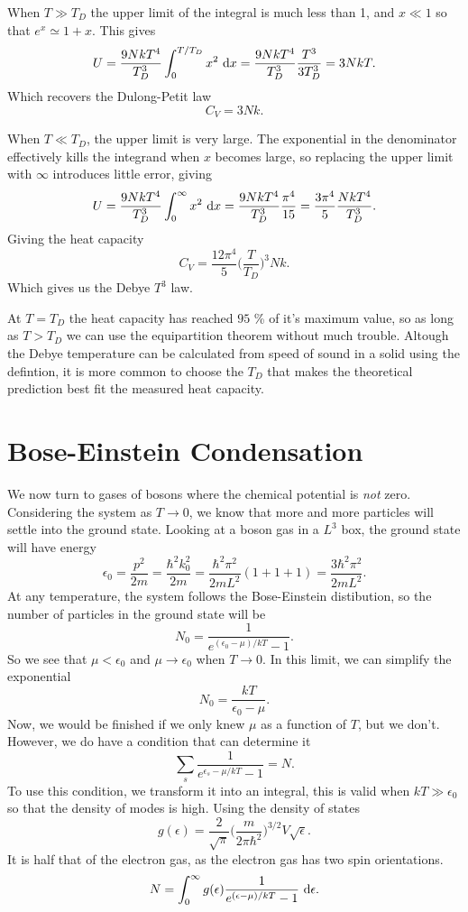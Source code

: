 \documentclass[a4paper, 11pt, notitlepage, english]{article}
\renewcommand{\d}{{\rm d}}
\newcommand{\eps}{\epsilon}
\begin{document}
When $T\gg T_D$ the upper limit of the integral is much less than 1, and $x \ll 1$ so that $e^x \simeq 1 + x$. This gives
$$U = \frac{9NkT^4}{T_D^3}\int_0^{T/T_D} x^2 \ \d x = \frac{9NkT^4}{T_D^3} \frac{T^3}{3T_D^3} = 3NkT.$$
Which recovers the Dulong-Petit law
$$C_V = 3Nk.$$

When $T \ll T_D$, the upper limit is very large. The exponential in the denominator effectively kills the integrand when $x$ becomes large, so replacing the upper limit with $\infty$ introduces little error, giving
$$U = \frac{9NkT^4}{T_D^3}\int_0^\infty x^2 \ \d x = \frac{9NkT^4}{T_D^3} \frac{\pi^4}{15} = \frac{3\pi^4}{5} \frac{NkT^4}{T_D^3}.$$
Giving the heat capacity
$$C_V = \frac{12\pi^4}{5}\bigg(\frac{T}{T_D}\bigg)^3Nk.$$
Which gives us the Debye $T^3$ law.

At $T = T_D$ the heat capacity has reached $95$ \% of it's maximum value, so as long as $T > T_D$ we can use the equipartition theorem without much trouble. Altough the Debye temperature can be calculated from speed of sound in a solid using the defintion, it is more common to choose the $T_D$ that makes the theoretical prediction best fit the measured heat capacity.

\clearpage

\section*{Bose-Einstein Condensation}

We now turn to gases of bosons where the chemical potential is \emph{not} zero. Considering the system as $T \to 0$, we know that more and more particles will settle into the ground state. Looking at a boson gas in a $L^3$ box, the ground state will have energy
$$\eps_0 = \frac{p^2}{2m} = \frac{\hbar^2k_0^2}{2m} = \frac{\hbar^2 \pi^2}{2mL^2}(1+1+1) = \frac{3\hbar^2 \pi^2}{2mL^2}.$$
At any temperature, the system follows the Bose-Einstein distibution, so the number of particles in the ground state will be
$$N_0 = \frac{1}{e^{(\eps_0 - \mu)/kT} - 1}.$$
So we see that $\mu < \eps_0$ and $\mu \to \eps_0$ when $T\to 0$. In this limit, we can simplify the exponential
$$N_0 = \frac{kT}{\eps_0 - \mu}.$$
Now, we would be finished if we only knew $\mu$ as a function of $T$, but we don't. However, we do have a condition that can determine it
$$\sum_s \frac{1}{e^{\eps_s -\mu/kT} - 1} = N.$$
To use this condition, we transform it into an integral, this is valid when $kT \gg \eps_0$ so that the density of modes is high. Using the density of states
$$g(\eps) = \frac{2}{\sqrt{\pi}}\bigg(\frac{m}{2\pi\hbar^2}\bigg)^{3/2} V \sqrt{\eps}.$$
It is half that of the electron gas, as the electron gas has two spin orientations.
$$N = \int_0^\infty g(\eps) \frac{1}{e^{(\eps-\mu)/kT}-1}\ \d \eps.$$
\end{document}
